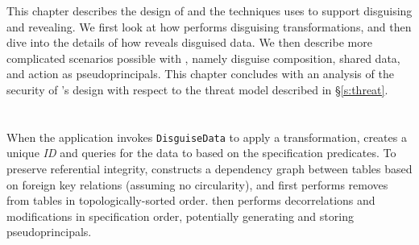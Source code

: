 This chapter describes the design of \sys and the techniques \sys uses to
support disguising and revealing. We first look at how \sys performs disguising
transformations, and then dive into the details of how \sys reveals disguised
data.
We then describe more complicated scenarios possible with \sys, namely
disguise composition, shared data, and action as pseudoprincipals.  This chapter
concludes with an analysis of the security of \sys's design with respect to the
threat model described in \S\ref{s:threat}.

\section{\Xxing}
\label{s:applying}

When the application invokes \texttt{DisguiseData} to apply a \xxing transformation, \sys creates a unique \emph{\xx ID} and
queries for the data to \xx based on the \xx specification predicates.
%
To preserve referential integrity, \sys constructs a dependency graph between
tables based on foreign key relations (assuming no circularity), and first
performs removes from tables in topologically-sorted order.  \sys then performs
decorrelations and modifications in specification order, potentially generating
and storing pseudoprincipals.
%

%
%

